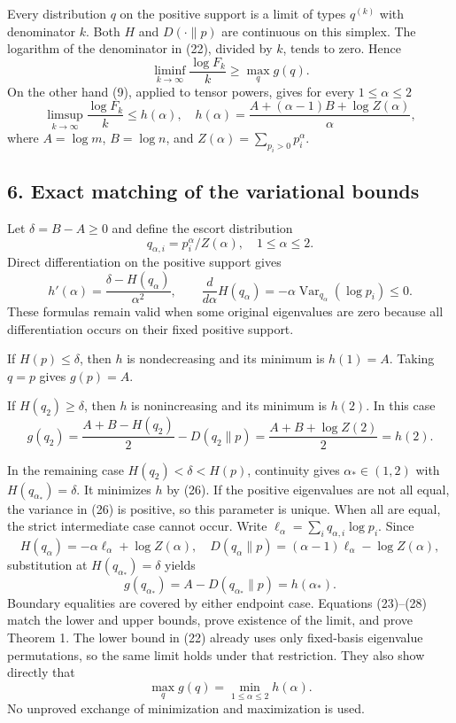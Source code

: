 \documentclass[11pt]{article}
\begin{document}
Every distribution \(q\) on the positive support is a limit of types \(q^{(k)}\) with denominator \(k\). Both \(H\) and \(D(\cdot\|p)\) are continuous on this simplex. The logarithm of the denominator in (22), divided by \(k\), tends to zero. Hence \[
 \liminf_{k\to\infty}\frac{\log F_k}{k}\ge\max_q g(q).
 \tag{23}
\] On the other hand (9), applied to tensor powers, gives for every \(1\le\alpha\le2\) \[
 \limsup_{k\to\infty}\frac{\log F_k}{k}\le h(\alpha),
 \quad
 h(\alpha)=\frac{A+(\alpha-1)B+\log Z(\alpha)}\alpha,
 \tag{24}
\] where \(A=\log m\), \(B=\log n\), and \(Z(\alpha)=\sum_{p_i>0}p_i^\alpha\).

\hypertarget{exact-matching-of-the-variational-bounds}{%
\subsection{6. Exact matching of the variational bounds}\label{exact-matching-of-the-variational-bounds}}

Let \(\delta=B-A\ge0\) and define the escort distribution \[
 q_{\alpha,i}=p_i^\alpha/Z(\alpha),\quad 1\le\alpha\le2.
 \tag{25}
\] Direct differentiation on the positive support gives \[
 h'(\alpha)=\frac{\delta-H(q_\alpha)}{\alpha^2},\qquad
 \frac{d}{d\alpha}H(q_\alpha)
 =-\alpha\operatorname{Var}_{q_\alpha}(\log p_i)\le0.
 \tag{26}
\] These formulas remain valid when some original eigenvalues are zero because all differentiation occurs on their fixed positive support.

If \(H(p)\le\delta\), then \(h\) is nondecreasing and its minimum is \(h(1)=A\). Taking \(q=p\) gives \(g(p)=A\).

If \(H(q_2)\ge\delta\), then \(h\) is nonincreasing and its minimum is \(h(2)\). In this case \[
 g(q_2)=\frac{A+B-H(q_2)}2-D(q_2\|p)
       =\frac{A+B+\log Z(2)}2=h(2).
 \tag{27}
\]

In the remaining case \(H(q_2)<\delta<H(p)\), continuity gives \(\alpha_*\in(1,2)\) with \(H(q_{\alpha_*})=\delta\). It minimizes \(h\) by (26). If the positive eigenvalues are not all equal, the variance in (26) is positive, so this parameter is unique. When all are equal, the strict intermediate case cannot occur. Write \(\ell_\alpha=\sum_iq_{\alpha,i}\log p_i\). Since \[
 H(q_\alpha)=-\alpha\ell_\alpha+\log Z(\alpha),\quad
 D(q_\alpha\|p)=(\alpha-1)\ell_\alpha-\log Z(\alpha),
\] substitution at \(H(q_{\alpha_*})=\delta\) yields \[
 g(q_{\alpha_*})=A-D(q_{\alpha_*}\|p)=h(\alpha_*).
 \tag{28}
\] Boundary equalities are covered by either endpoint case. Equations (23)--(28) match the lower and upper bounds, prove existence of the limit, and prove Theorem 1. The lower bound in (22) already uses only fixed-basis eigenvalue permutations, so the same limit holds under that restriction. They also show directly that \[
 \max_q g(q)=\min_{1\le\alpha\le2}h(\alpha).
 \tag{29}
\] No unproved exchange of minimization and maximization is used.
\end{document}
